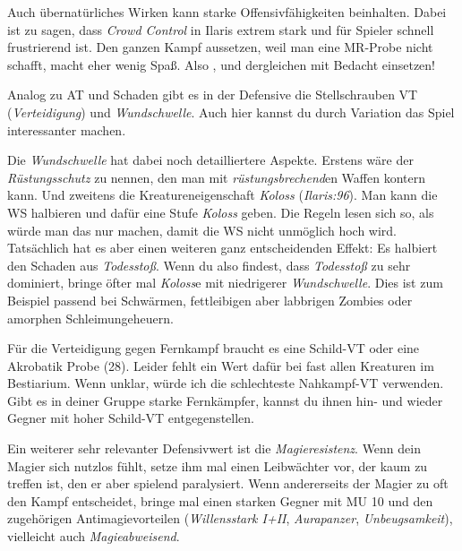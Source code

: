 Auch übernatürliches Wirken kann starke Offensivfähigkeiten beinhalten.
Dabei ist zu sagen, dass \textit{Crowd Control} in Ilaris extrem stark und für Spieler schnell frustrierend ist.
Den ganzen Kampf aussetzen, weil man eine MR-Probe nicht schafft, macht eher wenig Spaß.
Also ,  und dergleichen mit Bedacht einsetzen!

\spaltenende
\begin{center}
\end{center}
\spaltenanfang

Analog zu AT und Schaden gibt es in der Defensive die Stellschrauben VT (\textit{Verteidigung}) und \textit{Wundschwelle}.
Auch hier kannst du durch Variation das Spiel interessanter machen.

Die \textit{Wundschwelle} hat dabei noch detailliertere Aspekte. Erstens wäre der \textit{Rüstungsschutz} zu nennen, den man mit \textit{rüstungsbrechend}en Waffen kontern kann. Und zweitens die Kreatureneigenschaft \textit{Koloss} (\textit{Ilaris:96}). Man kann die WS halbieren und dafür eine Stufe \textit{Koloss} geben. Die Regeln lesen sich so, als würde man das nur machen, damit die WS nicht unmöglich hoch wird. Tatsächlich hat es aber einen weiteren ganz entscheidenden Effekt: Es halbiert den Schaden aus \textit{Todesstoß}. Wenn du also findest, dass \textit{Todesstoß} zu sehr dominiert, bringe öfter mal \textit{Koloss}e mit niedrigerer \textit{Wundschwelle}. Dies ist zum Beispiel passend bei Schwärmen, fettleibigen aber labbrigen Zombies oder amorphen Schleimungeheuern. 

\neuespalte

Für die Verteidigung gegen Fernkampf braucht es eine Schild-VT oder eine Akrobatik Probe (28). Leider fehlt ein Wert dafür bei fast allen Kreaturen im Bestiarium. Wenn unklar, würde ich die schlechteste Nahkampf-VT verwenden. Gibt es in deiner Gruppe starke Fernkämpfer, kannst du ihnen hin- und wieder Gegner mit hoher Schild-VT entgegenstellen.

Ein weiterer sehr relevanter Defensivwert ist die \textit{Magieresistenz}.
Wenn dein Magier sich nutzlos fühlt, setze ihm mal einen Leibwächter vor, der kaum zu treffen ist, den er aber spielend paralysiert.
Wenn andererseits der Magier zu oft den Kampf entscheidet, bringe mal einen starken Gegner mit MU 10 und den zugehörigen Antimagievorteilen (\textit{Willensstark I+II}, \textit{Aurapanzer}, \textit{Unbeugsamkeit}), vielleicht auch \textit{Magieabweisend}.



